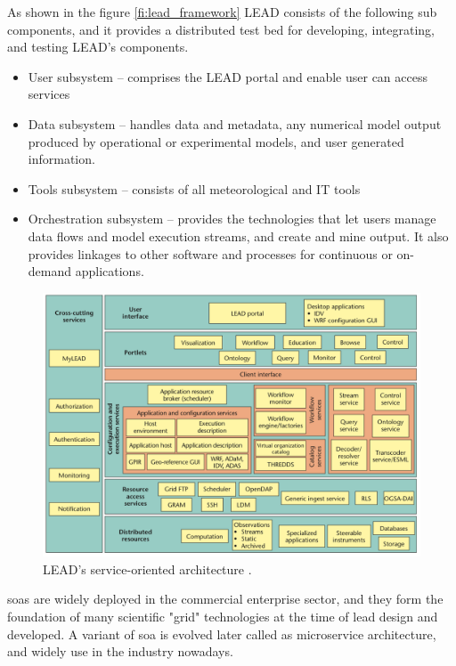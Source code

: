 As shown in the figure \ref{fi:lead_framework} LEAD consists of the following sub components, and it provides a distributed test bed for developing, integrating, and testing LEAD's components.
\begin{itemize}
    \item User subsystem -- comprises the LEAD portal and enable user can access services
    \item Data subsystem -- handles data and metadata, any numerical model output produced by operational or experimental models, and user generated information.
    \item Tools subsystem -- consists of all meteorological and IT tools
    \item Orchestration subsystem -- provides the technologies that let users manage data flows and model execution streams, and create and mine output. It also provides linkages to other software and processes for continuous or on-demand applications. 
\end{itemize}

\begin{figure}[htp]
    \centering
    \includegraphics[width=1\textwidth]{lit/lead/LEADs-service-oriented-architecture-A-wide-variety-of-services-and-resources-grouped_W640.png}
    \caption[LEAD's service-oriented architecture]{LEAD's service-oriented architecture \cite{Droegemeier2005Service-OrientedWeather}.}
    \label{fi:lead_soa}
\end{figure}

\acrshort{soa}s are widely deployed in the commercial enterprise sector, and they form the foundation of many scientific "grid" technologies at the time of \acrshort{lead} design and developed. A variant of \acrshort{soa} is evolved later called as microservice architecture, and widely use in the industry nowadays.

